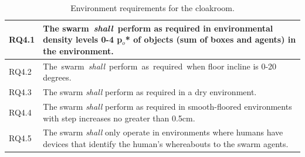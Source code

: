 \documentclass[lettersize,journal]{IEEEtran}
\begin{document}
\begin{table}[!h]
	\centering
	\begin{tabular}{|p{7mm}|p{72mm}|}
		\hline
		RQ4.1 & The swarm \emph{shall} perform as required in environmental density levels 0-4 \textbf{p$_o$* of objects (sum of boxes and agents)} in the environment.
		\\ 
		\hline
		RQ4.2 & The swarm \emph{shall} perform as required when floor incline is 0-20 degrees.
		\\ 
		\hline
		RQ4.3 & The swarm \emph{shall} perform as required in a dry environment.
		\\ 
		\hline
		RQ4.4 & The swarm \emph{shall} perform as required in smooth-floored environments with step increases no greater than 0.5cm.
		\\ 
		\hline
		RQ4.5 & The swarm \emph{shall} only operate in environments where humans have devices that identify the human’s whereabouts to the swarm agents.
		\\		[1ex] 		
		\hline
	\end{tabular}
	\caption{\label{tab:environment}Environment requirements for the cloakroom.}
\end{table}   
\end{document}
